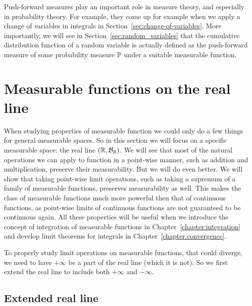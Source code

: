 Push-forward measures play an important role in measure theory, and especially in probability theory. For example, they come up for example when we apply a change of variables in integrals in Section~\ref{sec:change-of-variables}. More importantly, we will see in Section~\ref{sec:random_variables} that the cumulative distribution function of a random variable is actually defined as the push-forward measure of some probability measure $\mathbb P$ under a suitable measurable function.

\section{Measurable functions on the real line}\label{sec:measurable_functions_real_line}

When studying properties of measurable function we could only do a few things for general measurable spaces. So in this section we will focus on a specific measurable space: the real line $(\mathbb R, \mathcal B_{\mathbb R})$. We will see that most of the natural operations we can apply to function in a point-wise manner, such as addition and multiplication, preserve their measurability. But we will do even better. We will show that taking point-wise limit operations, such as taking a supremum of a family of measurable functions, preserves measurability as well. This makes the class of measurable functions much more powerful then that of continuous functions, as point-wise limits of continuous functions are not guaranteed to be continuous again. All these properties will be useful when we introduce the concept of integration of measurable functions in Chapter~\ref{chapter:integration} and develop limit theorems for integrals in Chapter~\ref{chapter:convergence}.

To properly study limit operations on measurable functions, that could diverge, we need to have $+\infty$ be a part of the real line (which it is not). So we first extend the real line to include both $+\infty$ and $-\infty$.


\subsection{Extended real line}

